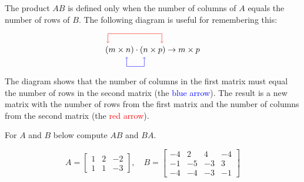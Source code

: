 The product $AB$ is defined only when the number of columns of $A$ equals the number of rows of $B$. The following diagram is useful for remembering this:


\[
\begin{tikzpicture}
    \node at (0,0) {\((m \times n) \cdot (n \times p) \rightarrow m \times p\)};
    
    \draw[red,<-] (-1.9,0.3) -- (-1.9,0.7) -- (0.4,0.7);
    \draw[red,->] (0.4,0.7) -- (0.4,0.3);
    
    \draw[blue,<-] (-1.1,-0.3) -- (-1.1,-0.7) -- (-0.35,-0.7);
    \draw[blue,->] (-0.35,-0.7) -- (-0.35,-0.3);
\end{tikzpicture}
\]

The diagram shows that the number of columns in the first matrix must equal the number of rows in the second matrix (the \textcolor{blue}{blue arrow}). The result is a new matrix with the number of rows from the first matrix and the number of columns from the second matrix (the \textcolor{red}{red arrow}).

\begin{example}
    For $A$ and $B$ below compute $AB$ and $BA$.

    \[
    A=\left[\begin{array}{lll}
    1 & 2 & -2 \\
    1 & 1 & -3
    \end{array}\right], \quad B=\left[\begin{array}{cccc}
    -4 & 2 & 4 & -4 \\
    -1 & -5 & -3 & 3 \\
    -4 & -4 & -3 & -1
    \end{array}\right]
    \]
    
\end{example}

